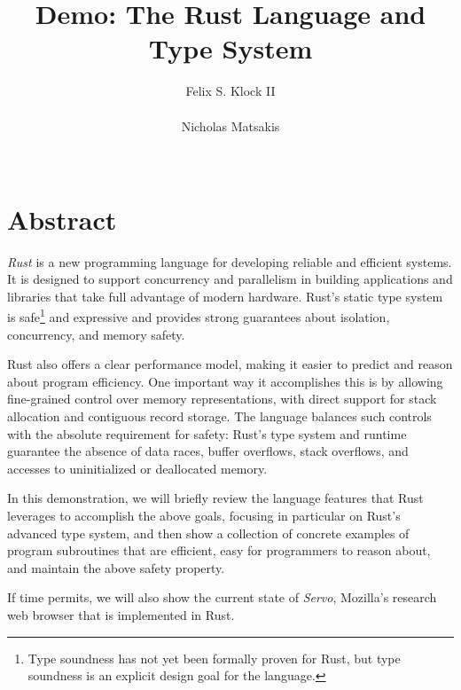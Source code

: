 \documentclass{acm_proc_article-sp}
\begin{document}
\title{Demo: The Rust Language and Type System}
\author{
\alignauthor
Felix S. Klock II\\
    \\
\alignauthor
Nicholas Matsakis\\
    \\
}
\maketitle

\section{Abstract}

\emph{Rust} is a new programming language for developing reliable and
efficient systems.  It is designed to support concurrency and
parallelism in building applications and libraries that take full
advantage of modern hardware.
 Rust's static type system is safe\footnote{Type soundness has not
  yet been formally proven for Rust, but type soundness is an
  explicit design goal for the language.} and expressive
and provides strong guarantees about isolation,
concurrency, and memory safety.

Rust also offers a clear performance model, making it easier to
predict and reason about program efficiency.  One important way it
accomplishes this is by allowing fine-grained control over memory
representations, with direct support for stack allocation and
contiguous record storage.  The language balances such controls with
the absolute requirement for safety: Rust's type system and runtime
guarantee the absence of data races, buffer overflows, stack overflows,
and accesses to uninitialized or deallocated memory.

In this demonstration, we will briefly review the language features
that Rust leverages to accomplish the above goals, focusing in
particular on Rust's advanced type system, and then show a collection
of concrete examples of program subroutines that are efficient, easy
for programmers to reason about, and maintain the above safety
property.

If time permits, we will also show the current state of \emph{Servo},
Mozilla's research web browser that is implemented in Rust.

\end{document}
